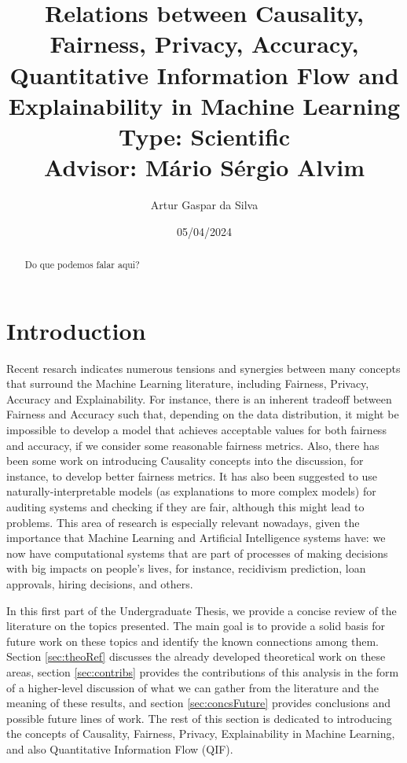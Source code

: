\documentclass{article}
\title{Relations between Causality, Fairness, Privacy, Accuracy, Quantitative Information Flow and Explainability in Machine Learning\large\\ Type: Scientific\\Advisor: Mário Sérgio Alvim}
\author{Artur Gaspar da Silva}
\date{05/04/2024}
\begin{document}
\maketitle

\begin{abstract}
    Do que podemos falar aqui?
\end{abstract}

\section{Introduction}

Recent resarch\cite{Sok}\cite{Reductions}\cite{Rachel}\cite{Awareness} indicates numerous tensions and synergies between many concepts that surround the Machine Learning literature, including Fairness, Privacy, Accuracy and Explainability. For instance, there is an inherent tradeoff between Fairness and Accuracy such that, depending on the data distribution, it might be impossible to develop a model that achieves acceptable values for both fairness and accuracy, if we consider some reasonable fairness metrics\cite{Carlos}. Also, there has been some work on introducing Causality concepts into the discussion, for instance, to develop better fairness metrics\cite{CausalFair}. It has also been suggested to use naturally-interpretable models (as explanations to more complex models) for auditing systems and checking if they are fair, although this might lead to problems\cite{ExplainAll}. This area of research is especially relevant nowadays, given the importance that Machine Learning and Artificial Intelligence systems have: we now have computational systems that are part of processes of making decisions with big impacts on people's lives, for instance, recidivism prediction\cite{Compass}, loan approvals\cite{Loans}, hiring decisions\cite{Jobs}, and others.

In this first part of the Undergraduate Thesis, we provide a concise review of the literature on the topics presented. The main goal is to provide a solid basis for future work on these topics and identify the known connections among them. Section \ref{sec:theoRef} discusses the already developed theoretical work on these areas, section \ref{sec:contribs} provides the contributions of this analysis in the form of a higher-level discussion of what we can gather from the literature and the meaning of these results, and section \ref{sec:concsFuture} provides conclusions and possible future lines of work. The rest of this section is dedicated to introducing the concepts of Causality, Fairness, Privacy, Explainability in Machine Learning, and also Quantitative Information Flow (QIF).
\end{document}
